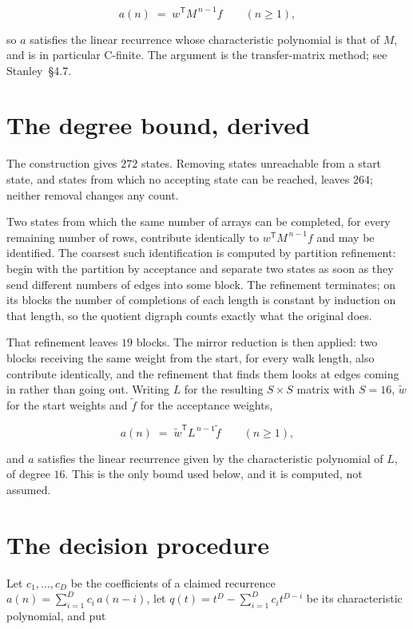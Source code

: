 \documentclass[11pt]{article}
\theoremstyle{definition}
\begin{document}
\[a(n) \;=\; w^{\mathsf T} M^{\,n-1} f \qquad (n \ge 1),\]

so $a$ satisfies the linear recurrence whose characteristic polynomial is that of $M$, and is in particular C-finite. The argument is the transfer-matrix method; see Stanley~\S4.7.

\section{The degree bound, derived}

The construction gives $272$ states. Removing states unreachable from a start state, and states from which no accepting state can be reached, leaves $264$; neither removal changes any count.

Two states from which the same number of arrays can be completed, for every remaining number of rows, contribute identically to $w^{\mathsf T}M^{\,n-1}f$ and may be identified. The coarsest such identification is computed by partition refinement: begin with the partition by acceptance and separate two states as soon as they send different numbers of edges into some block. The refinement terminates; on its blocks the number of completions of each length is constant by induction on that length, so the quotient digraph counts exactly what the original does.

That refinement leaves $19$ blocks. The mirror reduction is then applied: two blocks receiving the same weight from the start, for every walk length, also contribute identically, and the refinement that finds them looks at edges coming in rather than going out. Writing $L$ for the resulting $S \times S$ matrix with $S = 16$, $\tilde w$ for the start weights and $\tilde f$ for the acceptance weights,

\[a(n) \;=\; \tilde w^{\mathsf T} L^{\,n-1} \tilde f \qquad (n \ge 1),\]

and $a$ satisfies the linear recurrence given by the characteristic polynomial of $L$, of degree $16$. This is the only bound used below, and it is computed, not assumed.

\section{The decision procedure}

Let $c_1,\dots,c_D$ be the coefficients of a claimed recurrence $a(n) = \sum_{i=1}^{D} c_i\,a(n-i)$, let $q(t) = t^{D} - \sum_{i=1}^{D} c_i t^{D-i}$ be its characteristic polynomial, and put
\end{document}
